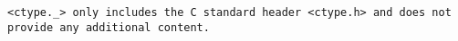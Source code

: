 \tt{<ctype._>} only includes the C standard header
\tt{<ctype.h>} and does not provide any additional content.
